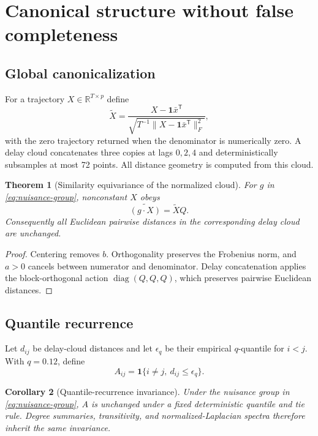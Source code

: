 \documentclass[10pt]{article}
\newtheorem{theorem}{Theorem}[section]
\newtheorem{corollary}[theorem]{Corollary}
\theoremstyle{definition}
\theoremstyle{remark}
\newcommand{\R}{\mathbb R}
\newcommand{\ind}{\mathbf 1}
\begin{document}
\section{Canonical structure without false completeness}
\label{sec:canonical}

\subsection{Global canonicalization}

For a trajectory $X\in\R^{T\times p}$ define
\begin{equation}
  \widetilde X
  =\frac{X-\bm1\bar x^\mathsf T}
  {\sqrt{T^{-1}\|X-\bm1\bar x^\mathsf T\|_F^2}},
  \label{eq:normalize}
\end{equation}
with the zero trajectory returned when the denominator is numerically zero. A delay cloud concatenates three copies at lags $0,2,4$ and deterministically subsamples at most 72 points. All distance geometry is computed from this cloud.

\begin{theorem}[Similarity equivariance of the normalized cloud]
\label{thm:similarity}
For $g$ in \cref{eq:nuisance-group}, nonconstant $X$ obeys
\begin{equation}
  \widetilde{(g\cdot X)}=\widetilde XQ.
\end{equation}
Consequently all Euclidean pairwise distances in the corresponding delay cloud are unchanged.
\end{theorem}

\begin{proof}
Centering removes $b$. Orthogonality preserves the Frobenius norm, and $a>0$ cancels between numerator and denominator. Delay concatenation applies the block-orthogonal action $\operatorname{diag}(Q,Q,Q)$, which preserves pairwise Euclidean distances.
\end{proof}

\subsection{Quantile recurrence}

Let $d_{ij}$ be delay-cloud distances and let $\epsilon_q$ be their empirical $q$-quantile for $i<j$. With $q=0.12$, define
\begin{equation}
  A_{ij}=\ind\{i\ne j,\ d_{ij}\le\epsilon_q\}.
  \label{eq:recurrence}
\end{equation}

\begin{corollary}[Quantile-recurrence invariance]
\label{cor:recurrence}
Under the nuisance group in \cref{eq:nuisance-group}, $A$ is unchanged under a fixed deterministic quantile and tie rule. Degree summaries, transitivity, and normalized-Laplacian spectra therefore inherit the same invariance.
\end{corollary}
\end{document}
